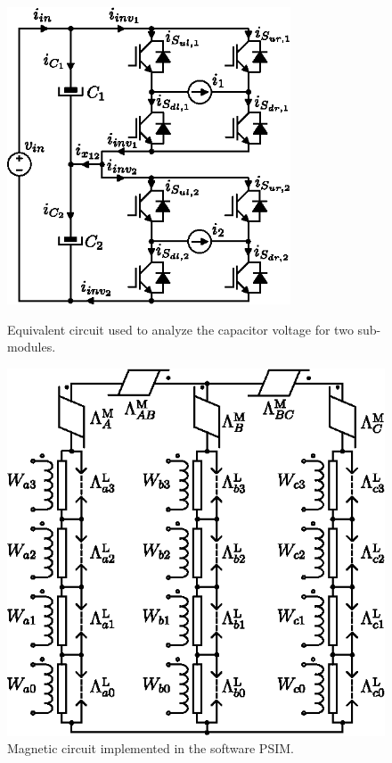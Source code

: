 \documentclass[letterpaper,oneside,onecolumn,draftclsnofoot,12pt,conference]{IEEEtran}
\begin{document}
 \begin{figure}[!h]
 	\centering
 	\begin{minipage}[b]{0.45\textwidth}	\centering
 		\includegraphics[width=0.75\textwidth]{Figs/MHF1F_ix.eps}
 		\caption{Equivalent circuit used to analyze the capacitor voltage for two sub-modules.}
 		\label{fig:MHF1F_ix}
 	\end{minipage}
 	\quad
 	\begin{minipage}[b]{0.45\textwidth} 	\centering
 		\includegraphics[width=0.8\linewidth]{Figs/MagneticCircuit}
 		\caption{Magnetic circuit implemented in the software PSIM.}
 		\label{fig:MagneticCircuit}
 	\end{minipage}
 \end{figure}
 
\end{document}
